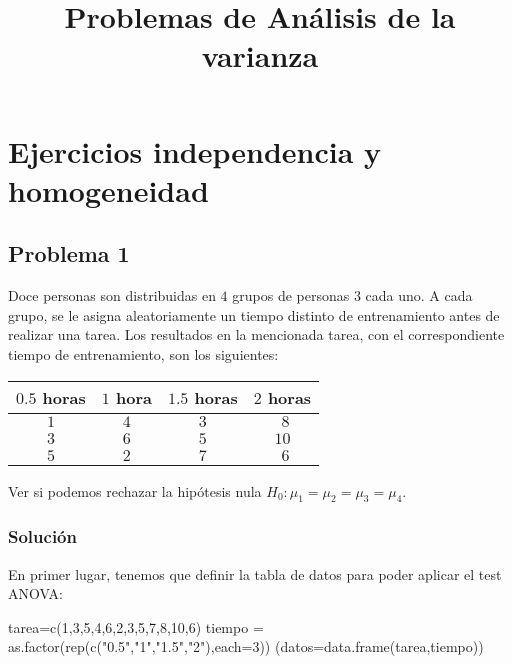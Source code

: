 \documentclass[
]{article}
\title{Problemas de Análisis de la varianza}
\author{}
\date{\vspace{-2.5em}}
\newenvironment{Shaded}{\begin{snugshade}}{\end{snugshade}}
\newcommand{\AttributeTok}[1]{\textcolor[rgb]{0.77,0.63,0.00}{#1}}
\newcommand{\DecValTok}[1]{\textcolor[rgb]{0.00,0.00,0.81}{#1}}
\newcommand{\FunctionTok}[1]{\textcolor[rgb]{0.00,0.00,0.00}{#1}}
\newcommand{\NormalTok}[1]{#1}
\newcommand{\OtherTok}[1]{\textcolor[rgb]{0.56,0.35,0.01}{#1}}
\newcommand{\StringTok}[1]{\textcolor[rgb]{0.31,0.60,0.02}{#1}}
\begin{document}
\maketitle

{
\hypersetup{linkcolor=blue}
\setcounter{tocdepth}{4}
\tableofcontents
}
\hypertarget{ejercicios-independencia-y-homogeneidad}{%
\section{Ejercicios independencia y
homogeneidad}\label{ejercicios-independencia-y-homogeneidad}}

\hypertarget{problema-1}{%
\subsection{Problema 1}\label{problema-1}}

Doce personas son distribuidas en \(4\) grupos de personas \(3\) cada
uno. A cada grupo, se le asigna aleatoriamente un tiempo distinto de
entrenamiento antes de realizar una tarea. Los resultados en la
mencionada tarea, con el correspondiente tiempo de entrenamiento, son
los siguientes:

\begin{center}
\begin{tabular}{|c|c|c|c|}
\hline
$0.5$ horas&$1$ hora&$1.5$ horas&$2$ horas\\\hline\hline
$1$&$4$&$3$&$\ \,8$\\\hline
$3$&$6$&$5$&$10$\\\hline
$5$&$2$&$7$&$\ \,6$\\\hline
\end{tabular}
\end{center}

Ver si podemos rechazar la hipótesis nula
\(H_0:\mu_1=\mu_2=\mu_3=\mu_4.\)

\hypertarget{soluciuxf3n}{%
\subsubsection{Solución}\label{soluciuxf3n}}

En primer lugar, tenemos que definir la tabla de datos para poder
aplicar el test ANOVA:

\begin{Shaded}
\begin{Highlighting}[]
\NormalTok{tarea}\OtherTok{=}\FunctionTok{c}\NormalTok{(}\DecValTok{1}\NormalTok{,}\DecValTok{3}\NormalTok{,}\DecValTok{5}\NormalTok{,}\DecValTok{4}\NormalTok{,}\DecValTok{6}\NormalTok{,}\DecValTok{2}\NormalTok{,}\DecValTok{3}\NormalTok{,}\DecValTok{5}\NormalTok{,}\DecValTok{7}\NormalTok{,}\DecValTok{8}\NormalTok{,}\DecValTok{10}\NormalTok{,}\DecValTok{6}\NormalTok{)}
\NormalTok{tiempo }\OtherTok{=} \FunctionTok{as.factor}\NormalTok{(}\FunctionTok{rep}\NormalTok{(}\FunctionTok{c}\NormalTok{(}\StringTok{"0.5"}\NormalTok{,}\StringTok{"1"}\NormalTok{,}\StringTok{"1.5"}\NormalTok{,}\StringTok{"2"}\NormalTok{),}\AttributeTok{each=}\DecValTok{3}\NormalTok{))}
\NormalTok{(}\AttributeTok{datos=}\FunctionTok{data.frame}\NormalTok{(tarea,tiempo))}
\end{Highlighting}
\end{Shaded}
\end{document}
